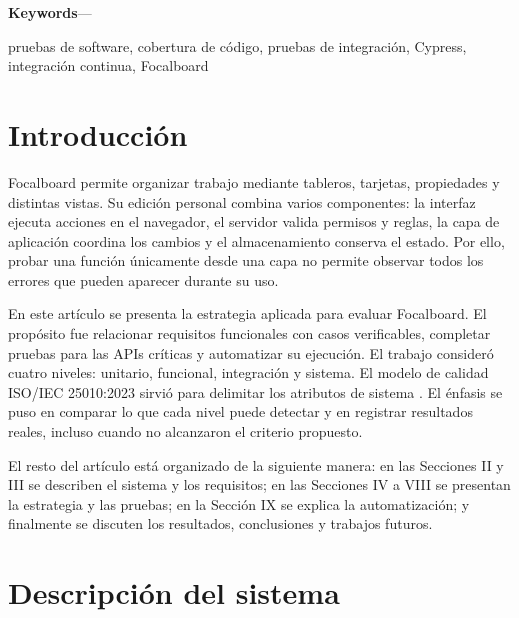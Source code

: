 \documentclass[conference]{IEEEtran}
\renewenvironment{IEEEkeywords}
{
  \par\small
  \noindent\textbf{Keywords}---\normalfont
}
{\par}
\begin{document}
\begin{IEEEkeywords}
pruebas de software, cobertura de código, pruebas de integración, Cypress, integración continua, Focalboard
\end{IEEEkeywords}
\vspace{\baselineskip}

\section{Introducción}
Focalboard permite organizar trabajo mediante tableros, tarjetas, propiedades y distintas vistas. Su edición personal combina varios componentes: la interfaz ejecuta acciones en el navegador, el servidor valida permisos y reglas, la capa de aplicación coordina los cambios y el almacenamiento conserva el estado. Por ello, probar una función únicamente desde una capa no permite observar todos los errores que pueden aparecer durante su uso.

En este artículo se presenta la estrategia aplicada para evaluar Focalboard. El propósito fue relacionar requisitos funcionales con casos verificables, completar pruebas para las APIs críticas y automatizar su ejecución. El trabajo consideró cuatro niveles: unitario, funcional, integración y sistema. El modelo de calidad ISO/IEC 25010:2023 sirvió para delimitar los atributos de sistema \cite{iso25010}. El énfasis se puso en comparar lo que cada nivel puede detectar y en registrar resultados reales, incluso cuando no alcanzaron el criterio propuesto.

El resto del artículo está organizado de la siguiente manera: en las Secciones II y III se describen el sistema y los requisitos; en las Secciones IV a VIII se presentan la estrategia y las pruebas; en la Sección IX se explica la automatización; y finalmente se discuten los resultados, conclusiones y trabajos futuros.
\vspace{\baselineskip}

\section{Descripción del sistema}
\end{document}
